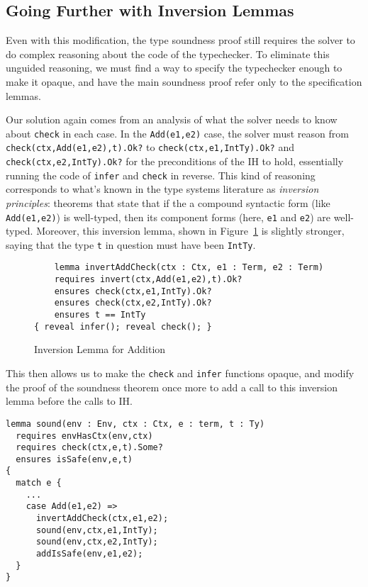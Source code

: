 \documentclass[sigplan,review,screen,anonymous]{acmart}
\begin{document}
\subsection*{Going Further with Inversion Lemmas}

Even with this modification, the type soundness proof still requires the solver to
do complex reasoning about the code of the typechecker. To eliminate this unguided
reasoning, we must find a way to specify the typechecker enough to make it opaque,
and have the main soundness proof refer only to the specification lemmas.

Our solution again comes from an analysis of what the solver needs to know about
\texttt{check} in each case. In the \texttt{Add(e1,e2)} case, the solver must
reason from \texttt{check(ctx,Add(e1,e2),t).Ok?} to \texttt{check(ctx,e1,IntTy).Ok?} and
\texttt{check(ctx,e2,IntTy).Ok?} for the preconditions of the IH to hold, essentially
running the code of \texttt{infer} and \texttt{check} in reverse.  This kind of reasoning
corresponds to what's known in the type systems literature as \emph{inversion
principles}: theorems that state that if the a compound syntactic form (like
\texttt{Add(e1,e2)}) is well-typed, then its component forms (here, \texttt{e1}
and \texttt{e2}) are well-typed. Moreover, this inversion lemma, shown in Figure~\ref{fig:add-invert} is slightly stronger, saying that
the type \texttt{t} in question must have been \texttt{IntTy}.


\begin{figure}
  \begin{verbatim}
    lemma invertAddCheck(ctx : Ctx, e1 : Term, e2 : Term)
    requires invert(ctx,Add(e1,e2),t).Ok?
    ensures check(ctx,e1,IntTy).Ok?
    ensures check(ctx,e2,IntTy).Ok?
    ensures t == IntTy
{ reveal infer(); reveal check(); }
  \end{verbatim}

  \caption{Inversion Lemma for Addition}
  \label{fig:add-invert}
\end{figure}

This then allows us to make the \texttt{check} and \texttt{infer} functions opaque, and modify
the proof of the soundness theorem once more to add a call to this inversion lemma before the calls to IH.

\begin{verbatim}
lemma sound(env : Env, ctx : Ctx, e : term, t : Ty)
  requires envHasCtx(env,ctx)
  requires check(ctx,e,t).Some?
  ensures isSafe(env,e,t)
{
  match e {
    ...
    case Add(e1,e2) =>
      invertAddCheck(ctx,e1,e2);
      sound(env,ctx,e1,IntTy);
      sound(env,ctx,e2,IntTy);
      addIsSafe(env,e1,e2);
  }
}
\end{verbatim}
\end{document}
